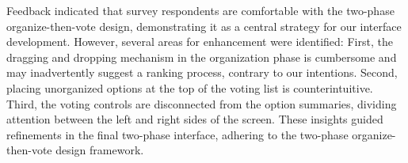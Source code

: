 Feedback indicated that survey respondents are comfortable with the two-phase organize-then-vote design, demonstrating it as a central strategy for our interface development. However, several areas for enhancement were identified: First, the dragging and dropping mechanism in the organization phase is cumbersome and may inadvertently suggest a ranking process, contrary to our intentions. Second, placing unorganized options at the top of the voting list is counterintuitive. Third, the voting controls are disconnected from the option summaries, dividing attention between the left and right sides of the screen. These insights guided refinements in the final two-phase interface, adhering to the two-phase organize-then-vote design framework.
